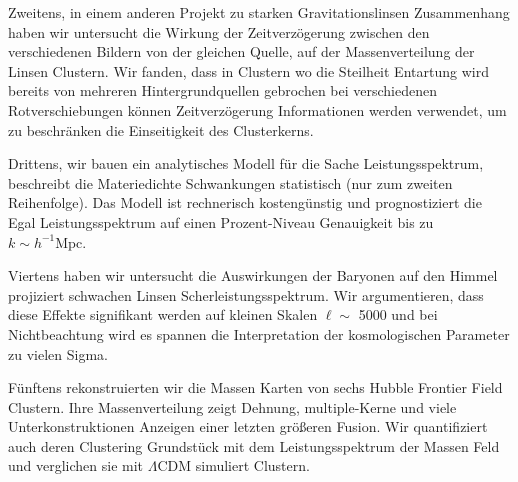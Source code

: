 Zweitens, in einem anderen Projekt zu starken Gravitationslinsen Zusammenhang haben wir untersucht
die Wirkung der Zeitverzögerung zwischen den verschiedenen Bildern von der gleichen Quelle,
auf der Massenverteilung der Linsen Clustern. Wir fanden, dass in Clustern
wo die Steilheit Entartung wird bereits von mehreren Hintergrundquellen gebrochen
bei verschiedenen Rotverschiebungen können Zeitverzögerung Informationen werden verwendet, um zu beschränken
die Einseitigkeit des Clusterkerns.

Drittens, wir bauen ein analytisches Modell für die Sache Leistungsspektrum,
beschreibt die Materiedichte Schwankungen statistisch (nur zum zweiten
Reihenfolge). Das Modell ist rechnerisch kostengünstig und prognostiziert die
Egal Leistungsspektrum auf einen Prozent-Niveau Genauigkeit bis zu
$ k\sim h^{-1} \mathrm{Mpc} $.

Viertens haben wir untersucht die Auswirkungen der Baryonen auf den Himmel projiziert schwachen Linsen
Scherleistungsspektrum. Wir argumentieren, dass diese Effekte signifikant werden
auf kleinen Skalen $\ell \sim$ 5000 und bei Nichtbeachtung wird es spannen die
Interpretation der kosmologischen Parameter zu vielen Sigma.

Fünftens rekonstruierten wir die Massen Karten von sechs Hubble Frontier Field Clustern.
Ihre Massenverteilung zeigt Dehnung, multiple-Kerne und viele Unterkonstruktionen
Anzeigen einer letzten größeren Fusion. Wir quantifiziert auch deren Clustering
Grundstück mit dem Leistungsspektrum der Massen Feld und verglichen sie
mit $\Lambda$CDM simuliert Clustern.
